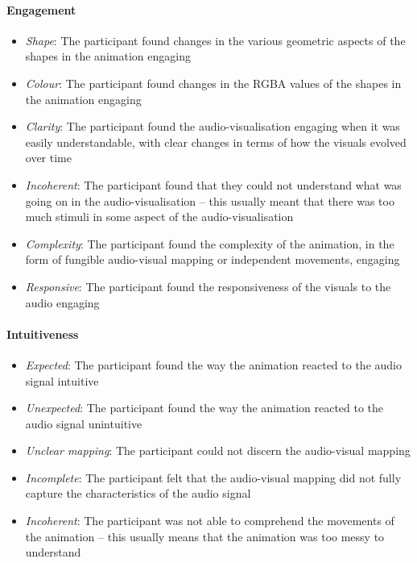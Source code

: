 \documentclass[../initial_thesis.tex]{subfiles}
\begin{document}
\paragraph{Engagement}
\begin{itemize}
\item {\emph{Shape}: The participant found changes in the various geometric aspects of the shapes in the animation engaging}
\item {\emph{Colour}: The participant found changes in the RGBA values of the shapes in the animation engaging}
\item {\emph{Clarity}: The participant found the audio-visualisation engaging when it was easily understandable, with clear changes in terms of how the visuals evolved over time}
\item {\emph{Incoherent}: The participant found that they could not understand what was going on in the audio-visualisation – this usually meant that there was too much stimuli in some aspect of the audio-visualisation}
\item {\emph{Complexity}: The participant found the complexity of the animation, in the form of fungible audio-visual mapping or independent movements, engaging}
\item {\emph{Responsive}: The participant found the responsiveness of the visuals to the audio engaging}
\end{itemize}

\paragraph{Intuitiveness}
\begin{itemize}
\item {\emph{Expected}: The participant found the way the animation reacted to the audio signal intuitive}
\item {\emph{Unexpected}: The participant found the way the animation reacted to the audio signal unintuitive}
\item {\emph{Unclear mapping}: The participant could not discern the audio-visual mapping}
\item {\emph{Incomplete}: The participant felt that the audio-visual mapping did not fully capture the characteristics of the audio signal}
\item {\emph{Incoherent}: The participant was not able to comprehend the movements of the animation – this usually means that the animation was too messy to understand}
\end{itemize}
\end{document}
